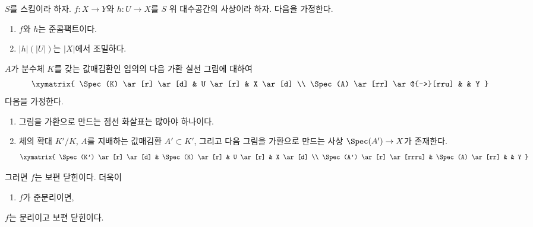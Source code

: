 \begin{lemma}
\label{lemma-refined-valuative-criterion-universally-closed}
$S$를 스킴이라 하자. $f : X \to Y$와 $h : U \to X$를 $S$ 위
대수공간의 사상이라 하자. 다음을 가정한다.
\begin{enumerate}
\item $f$와 $h$는 준콤팩트이다.
\item $|h|(|U|)$는 $|X|$에서 조밀하다.
\end{enumerate}
$A$가 분수체 $K$를 갖는 값매김환인 임의의 다음 가환 실선 그림에 대하여
$$
\xymatrix{
\Spec(K) \ar[r] \ar[d] & U \ar[r] & X \ar[d] \\
\Spec(A) \ar[rr] \ar@{-->}[rru] & & Y
}
$$
다음을 가정한다.
\begin{enumerate}
\item[(3)] 그림을 가환으로 만드는 점선 화살표는 많아야 하나이다.
\item[(4)] 체의 확대 $K'/K$, $A$를 지배하는 값매김환
$A' \subset K'$, 그리고 다음 그림을 가환으로 만드는 사상
$\Spec(A') \to X$가 존재한다.
$$
\xymatrix{
\Spec(K') \ar[r] \ar[d] & \Spec(K) \ar[r] & U \ar[r] & X \ar[d] \\
\Spec(A') \ar[r] \ar[rrru] & \Spec(A) \ar[rr] & & Y
}
$$
\end{enumerate}
그러면 $f$는 보편 닫힌이다. 더욱이
\begin{enumerate}
\item[(5)] $f$가 준분리이면,
\end{enumerate}
$f$는 분리이고 보편 닫힌이다.
\end{lemma}

